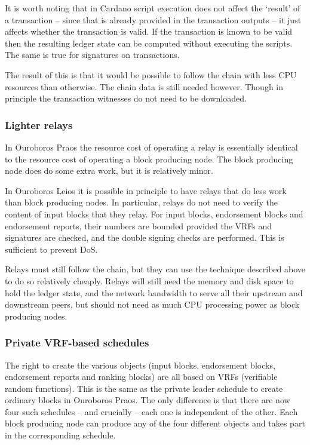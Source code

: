 \documentclass[11pt,a4paper]{article}
\begin{document}
It is worth noting that in Cardano script execution does not affect the `result'
of a transaction -- since that is already provided in the transaction outputs --
it just affects whether the transaction is valid. If the transaction is known
to be valid then the resulting ledger state can be computed without executing
the scripts. The same is true for signatures on transactions.

The result of this is that it would be possible to follow the chain with less
CPU resources than otherwise. The chain data is still needed however. Though in
principle the transaction witnesses do not need to be downloaded.

\subsubsection{Lighter relays}
In Ouroboros Praos the resource cost of operating a relay is essentially
identical to the resource cost of operating a block producing node. The block
producing node does do some extra work, but it is relatively minor.

In Ouroboros Leios it is possible in principle to have relays that do less work
than block producing nodes. In particular, relays do not need to verify the
content of input blocks that they relay. For input blocks, endorsement blocks
and endorsement reports, their numbers are bounded provided the VRFs and
signatures are checked, and the double signing checks are performed. This is
sufficient to prevent DoS.

Relays must still follow the chain,  but they can use the technique described
above to do so relatively cheaply. Relays will still need the memory and disk
space to hold the ledger state, and the network bandwidth to serve all their
upstream and downstream peers, but should not need as much CPU processing power
as block producing nodes.

\subsubsection{Private VRF-based schedules}
The right to create the various objects (input blocks, endorsement blocks,
endorsement reports and ranking blocks) are all based on VRFs (verifiable
random functions). This is the same as the private leader schedule to create
ordinary blocks in Ouroboros Praos. The only difference is that there are now
four such schedules -- and crucially -- each one is independent of the other.
Each block producing node can produce any of the four different objects and
takes part in the corresponding schedule.
\end{document}
